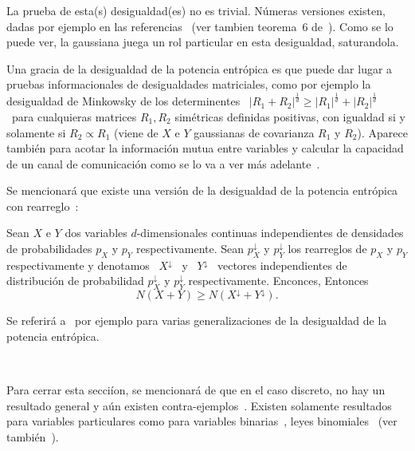La  prueba  de  esta(s)  desigualdad(es)  no es  trivial.   N\'umeras  versiones
existen,  dadas por  ejemplo  en las  referencias~\cite{Bla65, Sta59,  ShaWea64,
  Rio07,  Rio11,  Rio17,  CovTho06,  DemCov91,  Lie78,  VerGuo06}  (ver  tambien
teorema~6 de~\cite{Lie75}).   Como se  lo puede ver,  la gaussiana juega  un rol
particular en esta desigualdad, saturandola.

Una gracia de la desigualdad de la potencia entr\'opica es que puede dar lugar a
pruebas  informacionales  de  desigualdades  matriciales, como  por  ejemplo  la
desigualdad  de Minkowsky  de los  determinentes  \ $|R_1  + R_2|^{\frac1d}  \ge
|R_1|^{\frac1d}  +  |R_2|^{\frac1d}$  \  para cualquieras  matrices  $R_1,  R_2$
sim\'etricas definidas  positivas, con igualdad  si y solamente si  $R_2 \propto
R_1$  (viene de  $X$ e  $Y$ gaussianas  de covarianza  $R_1$ y  $R_2$).  Aparece
tambi\'en  para acotar  la informaci\'on  mutua  entre variables  y calcular  la
capacidad  de   un  canal  de  comunicaci\'on   como  se  lo  va   a  ver  m\'as
adelante~\cite{CovTho06, DemCov91, Rio07, Joh04}.

Se  mencionar\'a que  existe  una versi\'on  de  la desigualdad  de la  potencia
entr\'opica con rearreglo~\cite{WanMad04}:
%
\begin{teorema}
\label{Teo:SZ:EPIRearreglo}
%
  Sean  $X$ e $Y$  dos variables  $d$-dimensionales continuas  independientes de
  densidades   de   probabilidades   $p_X$   y   $p_Y$   respectivamente.   Sean
  $p^\downarrow_X$  y   $p^\downarrow_Y$  los   rearreglos  de  $p_X$   y  $p_Y$
  respectivamente y denotamos  \ $X^\downarrow$ \ y \  $Y^\downarrow$ \ vectores
  independientes   de   distribuci\'on   de  probabilidad   $p^\downarrow_X$   y
  $p^\downarrow_Y$ respectivamente. Enconces, Entonces
  \[
  N(X + Y) \ge N(X^\downarrow + Y^\downarrow).
  \]
\end{teorema}

Se referir\'a a~\cite[y Ref.]{MadBar07} por ejemplo para varias generalizaciones
de la desigualdad de la potencia entr\'opica.

\

Para cerrar esta secci\'ion, se mencionar\'a  de que en el caso discreto, no hay
un  resultado general  y a\'un  existen contra-ejemplos~\cite[Sec.~IV]{JohYu10}.
Existen  solamente resultados  para variables  particulares como  para variables
binarias~\cite{ShaWyn90},   leyes   binomiales~\cite{HarVig03,  ShaDas11}   (ver
tambi\'en~\cite{JohYu10, HagAbb14}).


